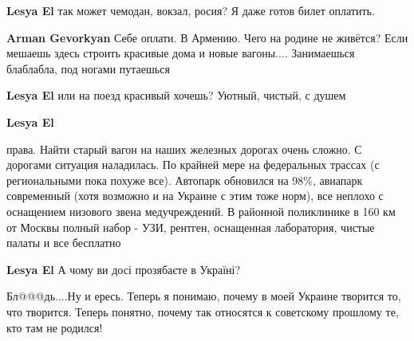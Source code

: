 \begin{itemize}
\begin{itemize}
\textbf{Lesya El} так может чемодан, вокзал, росия? Я даже готов билет оплатить.

 
\textbf{Arman Gevorkyan} Себе оплати. В Армению. Чего на родине не живётся? Если мешаешь здесь строить красивые дома и новые вагоны.... Занимаешься блаблабла, под ногами путаешься

 
\textbf{Lesya El} или на поезд красивый хочешь? Уютный, чистый, с душем

 
\textbf{Lesya El} 

права. Найти старый вагон на наших железных дорогах очень сложно. С дорогами
ситуация наладилась. По крайней мере на федеральных трассах (с региональными
пока похуже все). Автопарк обновился на 98\%, авиапарк современный (хотя
возможно и на Украине с этим тоже норм), все неплохо с оснащением низового
звена медучреждений. В районной поликлинике в 160 км от Москвы полный набор -
УЗИ, рентген, оснащенная лаборатория, чистые палаты и все бесплатно


 
\textbf{Lesya El} А чому ви досі прозябаєте в Україні?

\end{itemize}

 
Бл@@@дь....Ну и ересь. Теперь я понимаю, почему в моей Украине творится то, что
творится. Теперь понятно, почему так относятся к советскому прошлому те, кто
там не родился! 


\end{itemize}
